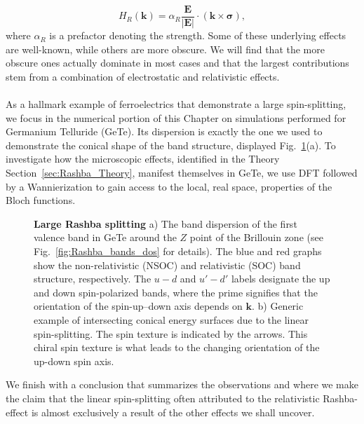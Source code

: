 \begin{equation}
	\label{eq:Rashba_form}
	H_R(\bm{k}) = \alpha_R \frac{\bm{E}}{|\bm{E}|} \cdot (\bm{k} \times \bm \sigma),
\end{equation}
where $\alpha_R$ is a prefactor denoting the strength.
Some of these underlying effects are well-known, while others are more obscure.
We will find that the more obscure ones actually dominate in most cases and that the largest contributions stem from a combination of electrostatic and relativistic effects.
\\\\
As a hallmark example of ferroelectrics that demonstrate a large spin-splitting, we focus in the numerical portion of this Chapter on simulations performed for Germanium Telluride (GeTe).
Its dispersion is exactly the one we used to demonstrate the conical shape of the band structure, displayed Fig.~\ref{fig:Rashba_intro_dispersion}(a).
To investigate how the microscopic effects, identified in the Theory Section~\ref{sec:Rashba_Theory}, manifest themselves in GeTe, we use DFT followed by a Wannierization to gain access to the local, real space, properties of the Bloch functions.
\begin{figure}[h]
	\caption{\label{fig:Rashba_intro_dispersion}
		{\bf Large Rashba splitting} a) The band dispersion of the first valence band in GeTe around the $Z$ point of the Brillouin zone (see Fig.~\ref{fig:Rashba_bands_dos} for details). The blue and red graphs show the non-relativistic (NSOC) and relativistic (SOC) band structure, respectively. The $u-d$ and $u'-d'$ labels designate the up and down spin-polarized bands, where the prime signifies that the orientation of the spin-up--down axis depends on $\bm{k}$. b) Generic example of intersecting conical energy surfaces due to the linear spin-splitting. The spin texture is indicated by the arrows. This chiral spin texture is what leads to the changing orientation of the up-down spin axis.}
\end{figure}

We finish with a conclusion that summarizes the observations and where we make the claim that the linear spin-splitting often attributed to the relativistic Rashba-effect is almost exclusively a result of the other effects we shall uncover.

